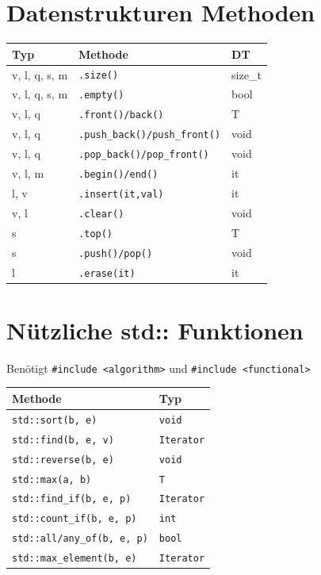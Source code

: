 \documentclass[9pt, landscape]{article}
\begin{document}
\begin{multicols*}{4}
 \section{Datenstrukturen Methoden}
\noindent
\begin{tabularx}{\linewidth}{l l >{\RaggedRight}X}
\toprule
\textbf{Typ} & \textbf{Methode} & \textbf{DT} \\
\midrule
v, l, q, s, m & \lstinline|.size()| & size\_t \\
v, l, q, s, m & \lstinline|.empty()| & bool \\
v, l, q & \lstinline|.front()/back()| & T \\
v, l, q& \lstinline|.push_back()/push_front()| & void \\
v, l, q & \lstinline|.pop_back()/pop_front()| & void \\
v, l, m & \lstinline|.begin()/end()| & it \\
l, v & \lstinline|.insert(it,val)| & it  \\
v, l & \lstinline|.clear()| & void \\
s & \lstinline|.top()| & T \\
s & \lstinline|.push()/pop()| & void \\
l & \lstinline|.erase(it)| & it  \\
\bottomrule
\end{tabularx}




 \section{Nützliche std:: Funktionen}
 Benötigt \lstinline|#include <algorithm>| und \lstinline|#include <functional>|

 \noindent
 \begin{tabularx}{\linewidth}{l >{\RaggedRight}X}
 \toprule
 \textbf{Methode} & \textbf{Typ} \\
 \midrule
 \lstinline|std::sort(b, e)| & \lstinline|void| \\
 \lstinline|std::find(b, e, v)| & \lstinline|Iterator| \\
 \lstinline|std::reverse(b, e)| & \lstinline|void|  \\
 \lstinline|std::max(a, b)| & \lstinline|T| \\
 \lstinline|std::find_if(b, e, p)| & \lstinline|Iterator|\\
 \lstinline|std::count_if(b, e, p)| & \lstinline|int|\\
 \lstinline|std::all/any_of(b, e, p)| & \lstinline|bool| \\
 \lstinline|std::max_element(b, e)| & \lstinline|Iterator|\\


\end{tabularx}
\end{multicols*}
\end{document}
